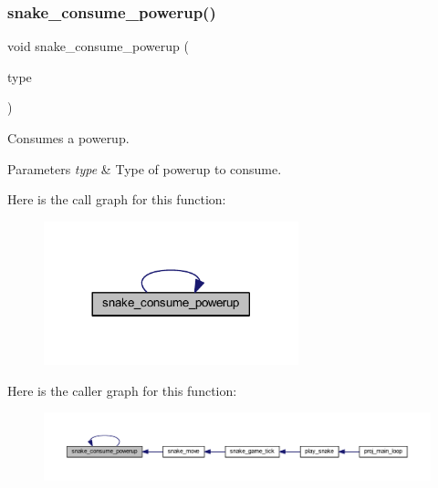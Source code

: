 \subsubsection{\texorpdfstring{snake\+\_\+consume\+\_\+powerup()}{snake\_consume\_powerup()}}
{\footnotesize\ttfamily void snake\+\_\+consume\+\_\+powerup (\begin{DoxyParamCaption}\item[{\mbox{\hyperlink{group__snake_gad58f93a5af4c0698fd0b903516c57c31}{Powerup\+Type}}}]{type }\end{DoxyParamCaption})}



Consumes a powerup. 


\begin{DoxyParams}{Parameters}
{\em type} & Type of powerup to consume. \\
\hline
\end{DoxyParams}
Here is the call graph for this function\+:\nopagebreak
\begin{figure}[H]
\begin{center}
\leavevmode
\includegraphics[width=209pt]{group__snake_gac6dab0ed48d449b3a7ab12cb1ce5087c_cgraph}
\end{center}
\end{figure}
Here is the caller graph for this function\+:\nopagebreak
\begin{figure}[H]
\begin{center}
\leavevmode
\includegraphics[width=350pt]{group__snake_gac6dab0ed48d449b3a7ab12cb1ce5087c_icgraph}
\end{center}
\end{figure}
\mbox{\label{group__snake_gae59edc17cc6d3f6f1fef0d047304265b}} 
